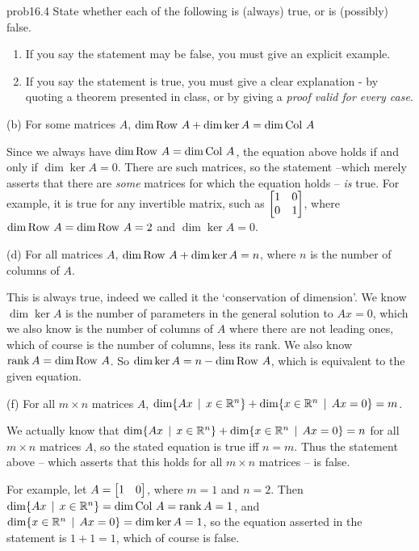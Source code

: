 \begin{sol}{prob16.4} State whether each of the following is (always) true,
or is (possibly) false.     
   \smallskip    
\begin{enumerate}[$\bullet$]
\item If you say the statement may be false, you must give an explicit example.   
\item If you say the statement is true, you must give a clear explanation -   by quoting a theorem presented in class, or by giving a {\it proof valid for every  case}. 
\end{enumerate}


(b) For some matrices $A$, $\dim \operatorname{Row\,} A+ \dim \ker A= \dim \operatorname{Col\,} A$

\soln Since we always have $\dim \operatorname{Row\,} A=\dim \operatorname{Col\,} A$, the equation above holds if and only if $\dim \ker A=0$. There are such matrices,  so the statement --which merely asserts that there are {\it some}   matrices for which the equation holds -- {\it is} true. For example,  it is true for any invertible  matrix, such as  $\bmatrix 1&0\\0&1\endbmatrix$, where $\dim \operatorname{Row\,} A=\dim \operatorname{Row\,} A=2$ and $\dim \ker A=0$.
\medskip
%

(d) For all matrices $A$, $\dim \operatorname{Row\,} A+ \dim \ker A= n$, where $n$ is the number of columns of $A$.

\soln This is always true, indeed we called it the `conservation of dimension'. We know $\dim \ker A$ is the number of parameters in the general solution to $Ax=0$, which we also know is the number of columns of $A$ where there are not leading ones, which of course is the number of columns, less its rank. We also know $\operatorname{rank} A=\dim \operatorname{Row\,} A$. So $\dim \ker A = n-\dim \operatorname{Row\,} A$, which is equivalent to the given equation.
\medskip

(f) For all $m\times n$ matrices $A$, $\dim \{Ax\,\mid \, x\in \mathbb{R}^n \} + \dim\{x \in \mathbb{R}^n \,\mid \, Ax=0 \}= m$.

\soln We actually know that $\dim \{Ax\,\mid \, x\in \mathbb{R}^n \} + \dim\{x \in \mathbb{R}^n \,\mid \, Ax=0 \}= n$ for all $m\times n$ matrices $A$, so the stated equation is true iff $n=m$. Thus the statement above -- which asserts that this holds for all $m\times n$ matrices -- is false. 

For example, let $A=\bmatrix 1&0 \endbmatrix$, where $m=1$ and $n=2$. Then
$\dim \{Ax\,\mid \, x\in \mathbb{R}^n \}=\dim \operatorname{Col\,} A= \operatorname{rank} A=1$, and $\dim\{x \in \mathbb{R}^n \,\mid \, Ax=0 \}=\dim \ker A=1$, so the equation asserted in the statement is $1+1=1$, which of course is false.
\medskip
%



\end{sol}
